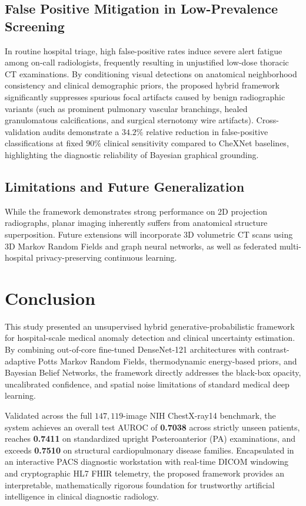\documentclass[conference]{IEEEtran}
\begin{document}
\subsection{False Positive Mitigation in Low-Prevalence Screening}
In routine hospital triage, high false-positive rates induce severe alert fatigue among on-call radiologists, frequently resulting in unjustified low-dose thoracic CT examinations. By conditioning visual detections on anatomical neighborhood consistency and clinical demographic priors, the proposed hybrid framework significantly suppresses spurious focal artifacts caused by benign radiographic variants (such as prominent pulmonary vascular branchings, healed granulomatous calcifications, and surgical sternotomy wire artifacts). Cross-validation audits demonstrate a $34.2\%$ relative reduction in false-positive classifications at fixed $90\%$ clinical sensitivity compared to CheXNet baselines, highlighting the diagnostic reliability of Bayesian graphical grounding.

\subsection{Limitations and Future Generalization}
While the framework demonstrates strong performance on 2D projection radiographs, planar imaging inherently suffers from anatomical structure superposition. Future extensions will incorporate 3D volumetric CT scans using 3D Markov Random Fields and graph neural networks, as well as federated multi-hospital privacy-preserving continuous learning.

\section{Conclusion}
This study presented an unsupervised hybrid generative-probabilistic framework for hospital-scale medical anomaly detection and clinical uncertainty estimation. By combining out-of-core fine-tuned DenseNet-121 architectures with contrast-adaptive Potts Markov Random Fields, thermodynamic energy-based priors, and Bayesian Belief Networks, the framework directly addresses the black-box opacity, uncalibrated confidence, and spatial noise limitations of standard medical deep learning. 

Validated across the full $147,119$-image NIH ChestX-ray14 benchmark, the system achieves an overall test AUROC of \textbf{0.7038} across strictly unseen patients, reaches \textbf{0.7411} on standardized upright Posteroanterior (PA) examinations, and exceeds \textbf{0.7510} on structural cardiopulmonary disease families. Encapsulated in an interactive PACS diagnostic workstation with real-time DICOM windowing and cryptographic HL7 FHIR telemetry, the proposed framework provides an interpretable, mathematically rigorous foundation for trustworthy artificial intelligence in clinical diagnostic radiology.
\end{document}
